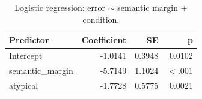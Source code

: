 \begin{table}[htbp]
\centering
\caption{Logistic regression: error $\sim$ semantic margin + condition.}
\label{tab:error-logistic}
\begin{tabular}{lrrr}
\toprule
Predictor & Coefficient & SE & p \\
\midrule
Intercept & -1.0141 & 0.3948 & 0.0102 \\
semantic\_margin & -5.7149 & 1.1024 & $<.001$ \\
atypical & -1.7728 & 0.5775 & 0.0021 \\
\bottomrule
\end{tabular}
\end{table}
